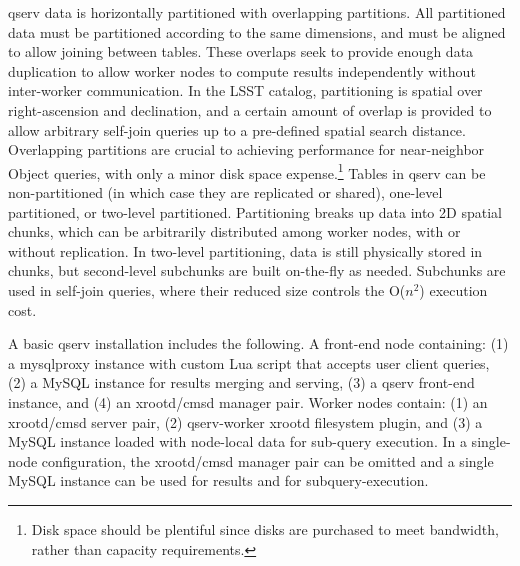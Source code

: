 \documentclass{article}
\begin{document}
qserv data is horizontally partitioned with overlapping partitions.
All partitioned data must be partitioned according to the same
dimensions, and must be aligned to allow joining between tables.
These overlaps seek to provide enough data duplication to allow worker
nodes to compute results independently without inter-worker
communication.  In the LSST catalog, partitioning is spatial over
right-ascension and declination, and a certain amount of overlap is
provided to allow arbitrary self-join queries up to a pre-defined
spatial search distance.  Overlapping partitions are crucial to
achieving performance for near-neighbor Object queries, with only a
minor disk space expense.\footnote{Disk space should be plentiful
  since disks are purchased to meet bandwidth, rather than capacity
  requirements.} Tables in qserv can be non-partitioned (in which case
they are replicated or shared), one-level partitioned, or two-level
partitioned.  Partitioning breaks up data into 2D spatial chunks,
which can be arbitrarily distributed among worker nodes, with or
without replication.  In two-level partitioning, data is still
physically stored in chunks, but second-level subchunks are built
on-the-fly as needed.  Subchunks are used in self-join queries, where
their reduced size controls the O($n^2$) execution cost.

A basic qserv installation includes the following.  A front-end node
containing: (1) a mysqlproxy instance with custom Lua script that
accepts user client queries, (2) a MySQL instance for results merging
and serving, (3) a qserv front-end instance, and (4) an xrootd/cmsd
manager pair. Worker nodes contain: (1) an xrootd/cmsd server pair,
(2) qserv-worker xrootd filesystem plugin, and (3) a MySQL instance
loaded with node-local data for sub-query execution.  In a single-node
configuration, the xrootd/cmsd manager pair can be omitted and a
single MySQL instance can be used for results and for
subquery-execution.
\end{document}

